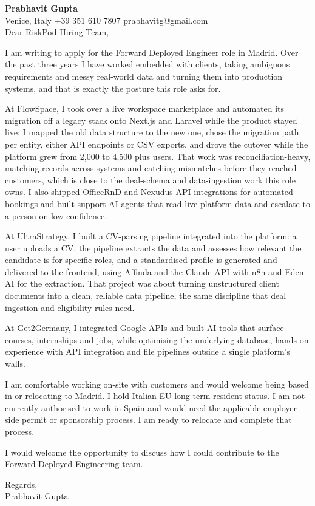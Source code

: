 \documentclass[a4paper,10.5pt]{article}
\begin{document}
\textbf{Prabhavit Gupta}\\
Venice, Italy \textbar{} +39 351 610 7807 \textbar{} prabhavitg@gmail.com\\[10pt]
Dear RiskPod Hiring Team,

I am writing to apply for the Forward Deployed Engineer role in Madrid. Over the past three years I have worked embedded with clients, taking ambiguous requirements and messy real-world data and turning them into production systems, and that is exactly the posture this role asks for.

At FlowSpace, I took over a live workspace marketplace and automated its migration off a legacy stack onto Next.js and Laravel while the product stayed live: I mapped the old data structure to the new one, chose the migration path per entity, either API endpoints or CSV exports, and drove the cutover while the platform grew from 2,000 to 4,500 plus users. That work was reconciliation-heavy, matching records across systems and catching mismatches before they reached customers, which is close to the deal-schema and data-ingestion work this role owns. I also shipped OfficeRnD and Nexudus API integrations for automated bookings and built support AI agents that read live platform data and escalate to a person on low confidence.

At UltraStrategy, I built a CV-parsing pipeline integrated into the platform: a user uploads a CV, the pipeline extracts the data and assesses how relevant the candidate is for specific roles, and a standardised profile is generated and delivered to the frontend, using Affinda and the Claude API with n8n and Eden AI for the extraction. That project was about turning unstructured client documents into a clean, reliable data pipeline, the same discipline that deal ingestion and eligibility rules need.

At Get2Germany, I integrated Google APIs and built AI tools that surface courses, internships and jobs, while optimising the underlying database, hands-on experience with API integration and file pipelines outside a single platform's walls.

I am comfortable working on-site with customers and would welcome being based in or relocating to Madrid. I hold Italian EU long-term resident status. I am not currently authorised to work in Spain and would need the applicable employer-side permit or sponsorship process. I am ready to relocate and complete that process.

I would welcome the opportunity to discuss how I could contribute to the Forward Deployed Engineering team.

Regards,\\
Prabhavit Gupta
\end{document}
